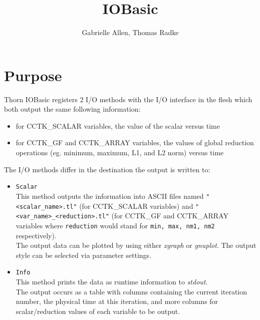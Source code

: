 \documentclass{article}
\begin{document}
\title{IOBasic}
\author{Gabrielle Allen, Thomas Radke}
\maketitle


\section{Purpose}
Thorn IOBasic registers 2 I/O methods with the I/O interface in the flesh
which both output the same following information:
%
\begin{itemize}
  \item for CCTK\_SCALAR variables, the value of the scalar versus time
  \item for CCTK\_GF and CCTK\_ARRAY variables, the values of global reduction
        operations (eg. minimum, maximum, L1, and L2 norm) versus time
\end{itemize}
%
The I/O methods differ in the destination the output is written to:
\begin{itemize}
  \item{\tt Scalar}\\
    This method outputs the information into ASCII files named {\tt "<scalar\_name>.tl"} (for CCTK\_SCALAR variables) and {\tt "<var\_name>\_<reduction>.tl"}
    (for CCTK\_GF and CCTK\_ARRAY variables where {\tt reduction} would stand
    for {\tt min, max, nm1, nm2} respectively).\\
    The output data can be plotted by using either {\it xgraph} or
    {\it gnuplot}. The output style can be selected via parameter settings.
  \item {\tt Info}\\
    This method prints the data as runtime information to {\it stdout}.\\
    The output occurs as a table with columns containing the current iteration
    number, the physical time at this iteration, and more columns for
    scalar/reduction values of each variable to be output.\\
\end{itemize}
%
%
\end{document}
